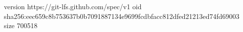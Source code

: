 version https://git-lfs.github.com/spec/v1
oid sha256:eec659c8b753637b0b7091887134e9699fcdbfacc812dfed21213ed74fd69003
size 700518
